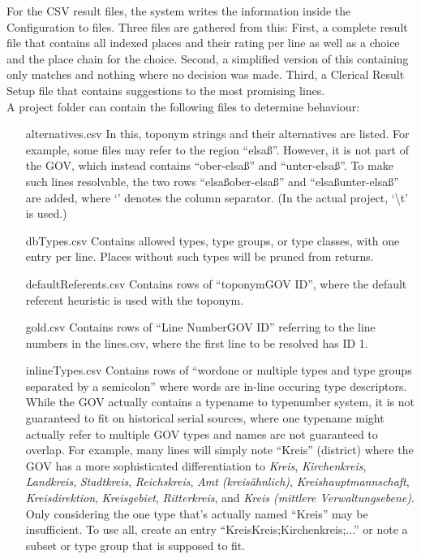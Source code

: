 \documentclass[11pt]{article}
\begin{document}
For the CSV result files, the system writes the information inside the Configuration to files. Three files are gathered from this: First, a complete result file that contains all indexed places and their rating per line as well as a choice and the place chain for the choice. Second, a simplified version of this containing only matches and nothing where no decision was made. Third, a Clerical Result Setup file that contains suggestions to the most promising lines.\\

A project folder can contain the following files to determine behaviour:
\begin{itemize}
\item[alternatives.csv] In this, toponym strings and their alternatives are listed. For example, some files may refer to the region ``elsaß''. However, it is not part of the GOV, which instead contains ``ober-elsaß'' and ``unter-elsaß''. To make such lines resolvable, the two rows ``elsaß\textbar ober-elsaß'' and ``elsaß\textbar unter-elsaß'' are added, where `\textbar' denotes the column separator. (In the actual project, `\textbackslash t' is used.)
\item[dbTypes.csv] Contains allowed types, type groups, or type classes, with one entry per line. Places without such types will be pruned from returns.
\item[defaultReferents.csv] Contains rows of ``toponym\textbar GOV ID'', where the default referent heuristic is used with the toponym.
\item[gold.csv] Contains rows of ``Line Number\textbar GOV ID'' referring to the line numbers in the lines.csv, where the first line to be resolved has ID 1.
\item[inlineTypes.csv] Contains rows of ``word\textbar one or multiple types and type groups separated by a semicolon'' where words are in-line occuring type descriptors. While the GOV actually contains a typename to typenumber system, it is not guaranteed to fit on historical serial sources, where one typename might actually refer to multiple GOV types and names are not guaranteed to overlap. For example, many lines will simply note ``Kreis'' (district) where the GOV has a more sophisticated differentiation to \emph{Kreis}, \emph{Kirchenkreis}, \emph{Landkreis}, \emph{Stadtkreis}, \emph{Reichskreis}, \emph{Amt (kreisähnlich)}, \emph{Kreishauptmannschaft}, \emph{Kreisdirektion}, \emph{Kreisgebiet}, \emph{Ritterkreis}, and \emph{Kreis (mittlere Verwaltungsebene)}. Only considering the one type that's actually named ``Kreis'' may be insufficient. To use all, create an entry ``Kreis\textbar Kreis;Kirchenkreis;...'' or note a subset or type group that is supposed to fit.


\end{itemize}
\end{document}
